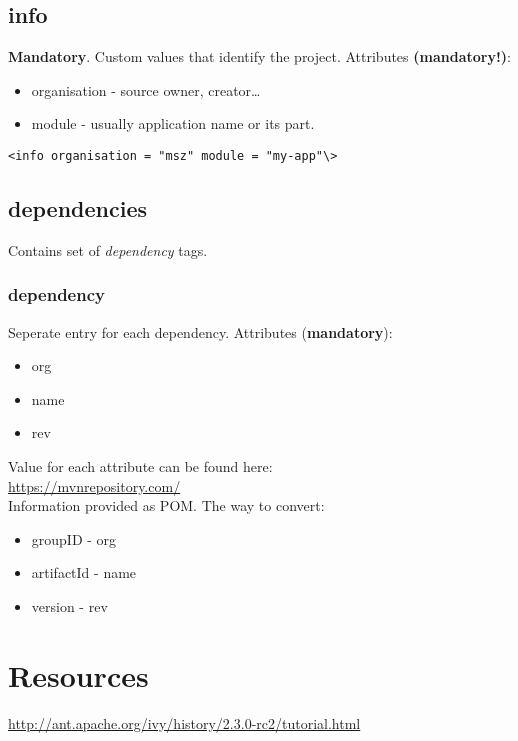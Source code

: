 \documentclass{report}
\begin{document}
\section{info}

\textbf{Mandatory}. Custom values that identify the project. Attributes \textbf{(mandatory!)}:
\begin{itemize}
  \item organisation - source owner, creator\ldots
  \item module - usually application name or its part.
\end{itemize}

\begin{verbatim}
<info organisation = "msz" module = "my-app"\>
\end{verbatim}

\section{dependencies}

Contains set of \textit{dependency} tags.

\subsection{dependency}
Seperate entry for each dependency. Attributes (\textbf{mandatory}):
\begin{itemize}
  \item org
  \item name
  \item rev
\end{itemize}
Value for each attribute can be found here:\\
\url{https://mvnrepository.com/}\\
Information provided as POM. The way to convert:
\begin{itemize}
  \item groupID - org
  \item artifactId - name
  \item version - rev
\end{itemize}




\chapter{Resources}

\url{http://ant.apache.org/ivy/history/2.3.0-rc2/tutorial.html}
\end{document}

